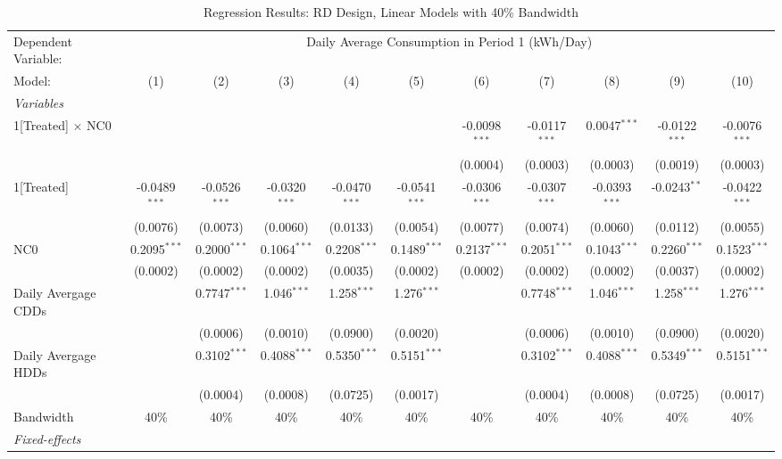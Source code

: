 \begin{table}[htbp]
\centering
\caption{\label{Table:Regression-Results_RD_Linear_BW-40} Regression Results: RD Design, Linear Models with 40\% Bandwidth}
\begin{tabular}{lcccccccccc}
\tabularnewline\toprule\toprule
Dependent Variable:&\multicolumn{10}{c}{Daily Average Consumption in Period 1 (kWh/Day)}\\
Model:&(1) & (2) & (3) & (4) & (5) & (6) & (7) & (8) & (9) & (10)\\
\midrule
\emph{Variables}&   &   &   &   &   &   &   &   &   &  \\
1[Treated] $\times $ NC0&   &    &    &    &    & -0.0098$^{***}$ & -0.0117$^{***}$ & 0.0047$^{***}$ & -0.0122$^{***}$ & -0.0076$^{***}$\\
  &   &    &    &    &    & (0.0004) & (0.0003) & (0.0003) & (0.0019) & (0.0003)\\
1[Treated]&-0.0489$^{***}$ & -0.0526$^{***}$ & -0.0320$^{***}$ & -0.0470$^{***}$ & -0.0541$^{***}$ & -0.0306$^{***}$ & -0.0307$^{***}$ & -0.0393$^{***}$ & -0.0243$^{**}$ & -0.0422$^{***}$\\
  &(0.0076) & (0.0073) & (0.0060) & (0.0133) & (0.0054) & (0.0077) & (0.0074) & (0.0060) & (0.0112) & (0.0055)\\
NC0&0.2095$^{***}$ & 0.2000$^{***}$ & 0.1064$^{***}$ & 0.2208$^{***}$ & 0.1489$^{***}$ & 0.2137$^{***}$ & 0.2051$^{***}$ & 0.1043$^{***}$ & 0.2260$^{***}$ & 0.1523$^{***}$\\
  &(0.0002) & (0.0002) & (0.0002) & (0.0035) & (0.0002) & (0.0002) & (0.0002) & (0.0002) & (0.0037) & (0.0002)\\
Daily Avergage CDDs&   & 0.7747$^{***}$ & 1.046$^{***}$ & 1.258$^{***}$ & 1.276$^{***}$ &    & 0.7748$^{***}$ & 1.046$^{***}$ & 1.258$^{***}$ & 1.276$^{***}$\\
  &   & (0.0006) & (0.0010) & (0.0900) & (0.0020) &    & (0.0006) & (0.0010) & (0.0900) & (0.0020)\\
Daily Avergage HDDs&   & 0.3102$^{***}$ & 0.4088$^{***}$ & 0.5350$^{***}$ & 0.5151$^{***}$ &    & 0.3102$^{***}$ & 0.4088$^{***}$ & 0.5349$^{***}$ & 0.5151$^{***}$\\
  &   & (0.0004) & (0.0008) & (0.0725) & (0.0017) &    & (0.0004) & (0.0008) & (0.0725) & (0.0017)\\
\midrule Bandwidth & 40\% & 40\% & 40\% & 40\% & 40\% & 40\% & 40\% & 40\% & 40\% & 40\%\\
\midrule
\emph{Fixed-effects}&   &   &   &   &   &   &   &   &   &  \\

\end{tabular}
\end{table}
